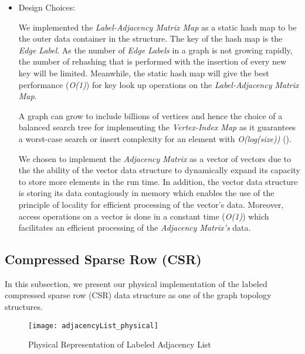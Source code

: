 {\begin{itemize}
By summing up the complexity of the three operations, the overall complexity of searching the structure is \textit{O(3 + 2log(n))}.

\item{Design Choices:}

We implemented the \textit{Label-Adjacency Matrix Map} as a static hash map to be the outer data container in the structure. The key of the hash map is the \textit{Edge Label}. As the number of \textit{Edge Labels} in a graph is not growing rapidly, the number of rehashing that is performed with the insertion of every new key will be limited. Meanwhile, the static hash map will give the best performance (\textit{O(1)}) for key look up operations on the \textit{Label-Adjacency Matrix Map}.

A graph can grow to include billions of vertices and hence the choice of a balanced search tree for implementing the \textit{Vertex-Index Map} as it guarantees a worst-case search or insert complexity for an element with \textit{O(log(size))}
(\cite{NSA}).

We chosen to implement the \textit{Adjacency Matrix} as a vector of vectors due to the the ability of the vector data structure to dynamically expand its capacity to store more elements in the run time. In addition, the vector data structure is storing its data contagiously in memory which enables the use of the principle of locality for efficient processing of the vector's data. Moreover, access operations on a vector is done in a constant time (\textit{O(1)}) which facilitates an efficient processing of the \textit{Adjacency Matrix's} data.

\end{itemize}

\subsection{Compressed Sparse Row (CSR)}

In this subsection, we present our physical implementation of the labeled compressed sparse row (CSR) data structure as one of the graph topology structures.



\begin{figure}[h]
\centering
\hspace*{-0.4in}
\texttt{[image: adjacencyList\_physical]}
\caption{Physical Representation of Labeled Adjacency List}
\label{fig_adjacencyList_physical}
\end{figure}


}
